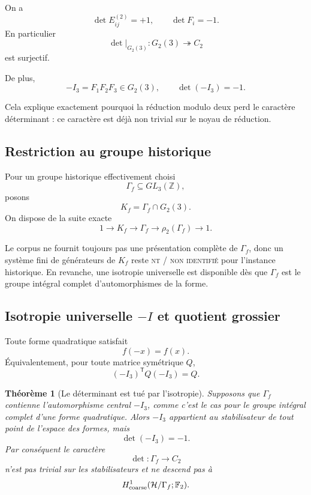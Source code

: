 \documentclass[11pt,a4paper]{article}
\newtheorem{theorem}{Théorème}[section]
\newcommand{\statusNT}{\textsc{nt / non identifié}}
\begin{document}
On a
\[
\det E_{ij}^{(2)}=+1,
\qquad
\det F_i=-1.
\]
En particulier
\[
\boxed{
\det|_{G_2(3)}:
G_2(3)\twoheadrightarrow C_2}
\]
est surjectif.

De plus,
\[
-I_3
=
F_1F_2F_3
\in G_2(3),
\qquad
\det(-I_3)=-1.
\]

Cela explique exactement pourquoi la réduction modulo deux perd le caractère déterminant : ce caractère est déjà non trivial sur le noyau de réduction.

\subsection{Restriction au groupe historique}

Pour un groupe historique effectivement choisi
\[
\Gamma_f
\subseteq
GL_3(\mathbb Z),
\]
posons
\[
K_f
=
\Gamma_f\cap G_2(3).
\]
On dispose de la suite exacte
\begin{equation}\label{eq:v22-restricted-exact}
\boxed{
1
\longrightarrow
K_f
\longrightarrow
\Gamma_f
\longrightarrow
\rho_2(\Gamma_f)
\longrightarrow
1.}
\end{equation}

Le corpus ne fournit toujours pas une présentation complète de $\Gamma_f$, donc un système fini de générateurs de $K_f$ reste \statusNT{} pour l'instance historique. En revanche, une isotropie universelle est disponible dès que $\Gamma_f$ est le groupe intégral complet d'automorphismes de la forme.

\subsection{Isotropie universelle \texorpdfstring{$-I$}{-I} et quotient grossier}

Toute forme quadratique satisfait
\[
f(-x)=f(x).
\]
Équivalentement, pour toute matrice symétrique $Q$,
\[
(-I_3)^{\mathsf T}
Q
(-I_3)
=
Q.
\]

\begin{theorem}[Le déterminant est tué par l'isotropie]\label{thm:v22-det-killed}
Supposons que $\Gamma_f$ contienne l'automorphisme central $-I_3$, comme c'est le cas pour le groupe intégral complet d'une forme quadratique. Alors $-I_3$ appartient au stabilisateur de tout point de l'espace des formes, mais
\[
\det(-I_3)=-1.
\]
Par conséquent le caractère
\[
\det:\Gamma_f\to C_2
\]
n'est pas trivial sur les stabilisateurs et ne descend pas à
\[
H^1_{\rm coarse}
(\mathcal H/\Gamma_f;\mathbb F_2).
\]
\end{theorem}
\end{document}
